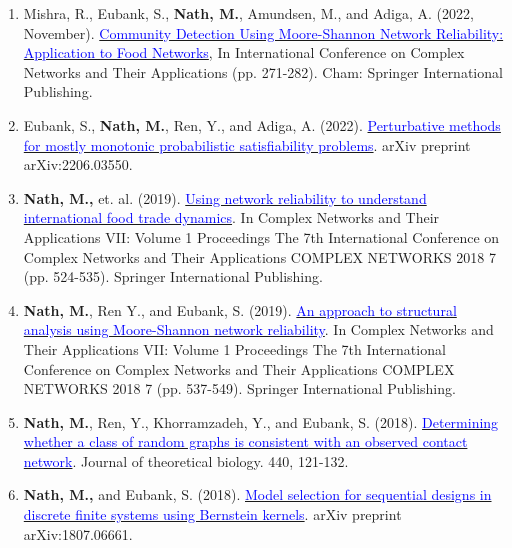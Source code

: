 \begin{enumerate}
    
\item
Mishra, R., Eubank, S., {\textbf{Nath, M.}}, Amundsen, M., and Adiga, A. (2022, November).
{\href{https://link.springer.com/chapter/10.1007/978-3-031-21131-7_21}{\textcolor{blue}{
Community Detection Using Moore-Shannon Network Reliability: Application to Food Networks}}}, In International Conference on Complex Networks and Their Applications (pp. 271-282). Cham: Springer International Publishing. {\label{com-det}}

\item
Eubank, S., {\textbf{Nath, M.}}, Ren, Y., and Adiga, A. (2022).
{\href{https://arxiv.org/abs/2206.03550}{\textcolor{blue}{Perturbative methods for mostly monotonic probabilistic satisfiability problems}}}. arXiv preprint arXiv:2206.03550.
{\label{arxiv-paper}}

\item
{\textbf{Nath, M.,}} et. al. (2019).
{\href{https://link.springer.com/chapter/10.1007/978-3-030-05411-3_43}{\textcolor{blue}{
Using network reliability to understand international food trade dynamics}}}. In Complex Networks and Their Applications VII: Volume 1 Proceedings The 7th International Conference on Complex Networks and Their Applications COMPLEX NETWORKS 2018 7 (pp. 524-535). Springer International Publishing. {\label{trade}}

\item
{\textbf{Nath, M.}}, Ren Y., and Eubank, S. (2019). 
{\href{https://link.springer.com/chapter/10.1007/978-3-030-05411-3_44}{\textcolor{blue}{
An approach to structural analysis using Moore-Shannon network reliability}}}. In
Complex Networks and Their Applications VII: Volume 1 Proceedings The 7th International Conference on Complex Networks and Their Applications COMPLEX NETWORKS 2018 7 (pp. 537-549). Springer International Publishing. {\label{comp-theory}}

\item 
{\textbf{Nath, M.}}, Ren, Y., Khorramzadeh, Y., and Eubank, S. (2018).
{\href{https://www.sciencedirect.com/science/article/pii/S002251931730560X}{\textcolor{blue}{
Determining whether a class of random graphs is consistent with an observed contact network}}}. Journal of theoretical biology. 440, 121-132. {\label{epi-paper}}
 
\item
{\textbf{Nath, M.,}} and Eubank, S. (2018).
{\href{https://arxiv.org/abs/1807.06661}{\textcolor{blue}{
Model selection for sequential designs in discrete finite systems using Bernstein kernels}}}. arXiv preprint arXiv:1807.06661. {\label{old-arxiv}}


\end{enumerate}

